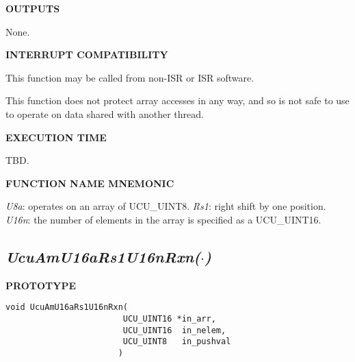 \noindent\textbf{OUTPUTS}
\begin{list}{}{\setlength{\leftmargin}{0.25in}\setlength{\topsep}{0.0in}}
\item None.
\end{list}
\vspace{2.8ex}

\noindent\textbf{INTERRUPT COMPATIBILITY}
\begin{list}{}{\setlength{\leftmargin}{0.25in}\setlength{\topsep}{0.0in}}
\item This function may be called from non-ISR or ISR software.
\item This function does not protect array accesses in any way, and so
      is not safe to use to operate on data shared with another thread.
\end{list}
\vspace{2.8ex}

\noindent\textbf{EXECUTION TIME}
\begin{list}{}{\setlength{\leftmargin}{0.25in}\setlength{\topsep}{0.0in}}
\item TBD.
\end{list}
\vspace{2.8ex}

\noindent\textbf{FUNCTION NAME MNEMONIC}
\begin{list}{}{\setlength{\leftmargin}{0.25in}\setlength{\topsep}{0.0in}}
\item \emph{U8a}:   operates on an array of UCU\_UINT8.
      \emph{Rs1}:   right shift by one position.
      \emph{U16n}:  the number of elements in the array is specified
                    as a UCU\_UINT16.
\end{list}


\subsection[\emph{UcuAmU16aRs1U16nRxn(\protect\mbox{\protect$\cdot$})}]
           {\emph{UcuAmU16aRs1U16nRxn(\protect\mbox{\protect\boldmath $\cdot$})}}
\label{cami0:srsf0:srsh1}

%

\noindent\textbf{PROTOTYPE}
\begin {list}{}{\setlength{\leftmargin}{0.25in}\setlength{\topsep}{0.0in}}
\item
\begin{verbatim}
void UcuAmU16aRs1U16nRxn(
                        UCU_UINT16 *in_arr, 
                        UCU_UINT16  in_nelem, 
                        UCU_UINT8   in_pushval
                       )
\end{verbatim}
\end{list}
\vspace{2.8ex}

